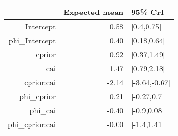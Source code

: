 \begin{tabular}{rrl}
  \hline
 & Expected mean & 95\% CrI \\ 
  \hline
Intercept & 0.58 & [0.4,0.75] \\ 
  phi\_Intercept & 0.40 & [0.18,0.64] \\ 
  cprior & 0.92 & [0.37,1.49] \\ 
  cai & 1.47 & [0.79,2.18] \\ 
  cprior:cai & -2.14 & [-3.64,-0.67] \\ 
  phi\_cprior & 0.21 & [-0.27,0.7] \\ 
  phi\_cai & -0.40 & [-0.9,0.08] \\ 
  phi\_cprior:cai & -0.00 & [-1.4,1.41] \\ 
   \hline
\end{tabular}

